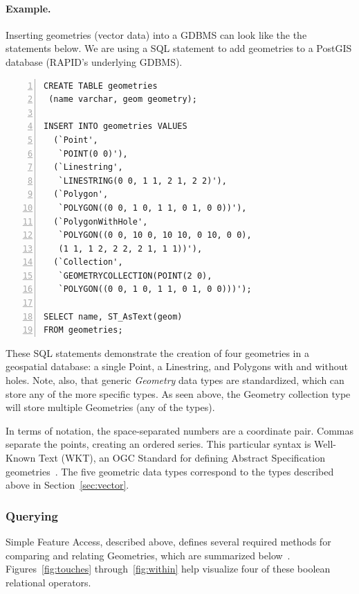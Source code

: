 \paragraph{Example.}
\label{background_wkt}
Inserting geometries (vector data) into a GDBMS can look like the the statements below. We are using a SQL statement to add geometries to a PostGIS database (RAPID's underlying GDBMS).

\begin{Verbatim}[samepage=true,baselinestretch=1,numbers=left,xleftmargin=12mm]
CREATE TABLE geometries
 (name varchar, geom geometry);

INSERT INTO geometries VALUES
  (`Point',
   `POINT(0 0)'),
  (`Linestring',
   `LINESTRING(0 0, 1 1, 2 1, 2 2)'),
  (`Polygon',
   `POLYGON((0 0, 1 0, 1 1, 0 1, 0 0))'),
  (`PolygonWithHole',
   `POLYGON((0 0, 10 0, 10 10, 0 10, 0 0),
   (1 1, 1 2, 2 2, 2 1, 1 1))'),
  (`Collection',
   `GEOMETRYCOLLECTION(POINT(2 0),
   `POLYGON((0 0, 1 0, 1 1, 0 1, 0 0)))');

SELECT name, ST_AsText(geom)
FROM geometries;
\end{Verbatim}

These SQL statements demonstrate the creation of four geometries in a geospatial database: a single Point, a Linestring, and Polygons with and without holes. Note, also, that generic \textit{Geometry} data types are standardized, which can store any of the more specific types. As seen above, the Geometry collection type will store multiple Geometries (any of the types).

In terms of notation, the space-separated numbers are a coordinate pair. Commas separate the points, creating an ordered series. This particular syntax is Well-Known Text (WKT), an OGC Standard for defining Abstract Specification geometries~\cite{ogc}. The five geometric data types correspond to the types described above in Section~\ref{sec:vector}.

\subsubsection{Querying}
Simple Feature Access, described above, defines several required methods for comparing and relating Geometries, which are summarized below~\cite{}. Figures~\ref{fig:touches} through~\ref{fig:within} help visualize four of these boolean relational operators.

